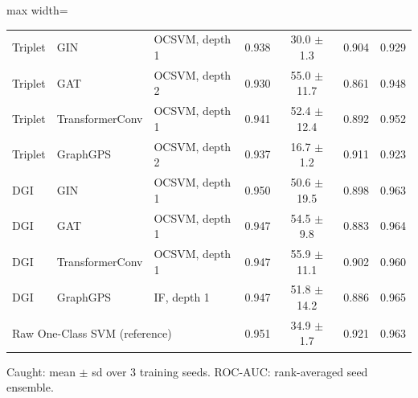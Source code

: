 \begin{table}[htbp]
\begin{adjustbox}{max width=\linewidth}
\begin{tabular}{lllcccc}
Triplet & GIN & OCSVM, depth 1 & 0.938 & 30.0 $\pm$ 1.3 & 0.904 & 0.929 \\
Triplet & GAT & OCSVM, depth 2 & 0.930 & 55.0 $\pm$ 11.7 & 0.861 & 0.948 \\
Triplet & TransformerConv & OCSVM, depth 1 & 0.941 & 52.4 $\pm$ 12.4 & 0.892 & 0.952 \\
Triplet & GraphGPS & OCSVM, depth 2 & 0.937 & 16.7 $\pm$ 1.2 & 0.911 & 0.923 \\
DGI & GIN & OCSVM, depth 1 & 0.950 & 50.6 $\pm$ 19.5 & 0.898 & 0.963 \\
DGI & GAT & OCSVM, depth 1 & 0.947 & 54.5 $\pm$ 9.8 & 0.883 & 0.964 \\
DGI & TransformerConv & OCSVM, depth 1 & 0.947 & 55.9 $\pm$ 11.1 & 0.902 & 0.960 \\
DGI & GraphGPS & IF, depth 1 & 0.947 & 51.8 $\pm$ 14.2 & 0.886 & 0.965 \\
\multicolumn{3}{l}{Raw One-Class SVM (reference)} & 0.951 & 34.9 $\pm$ 1.7 & 0.921 & 0.963 \\
\bottomrule
\end{tabular}
\end{adjustbox}
\par\smallskip
\parbox{0.95\linewidth}{\footnotesize Caught: mean $\pm$ sd over 3 training seeds. ROC-AUC: rank-averaged seed ensemble.}
\end{table}
